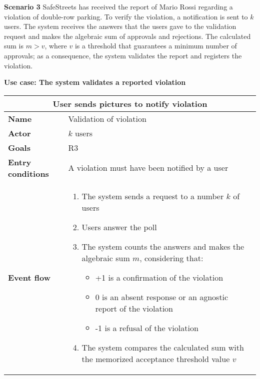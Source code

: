 \begin{description}
    \item \textbf{Scenario 3} \newline
        SafeStreets has received the report of Mario Rossi regarding a violation of double-row parking. To verify the violation, a notification is sent to $k$ users. The system receives the answers that the users gave to the validation request and makes the algebraic sum of approvals and rejections. The calculated sum is $m > v$, where $v$ is a threshold that guarantees a minimum number of approvals; as a consequence, the system validates the report and registers the violation.

    \item \textbf{Use case: The system validates a reported violation}
        \begin{center}
            \begin{tabular}{|p{3cm}|p{7cm}|}
                \multicolumn{2}{c}{\textbf{User sends pictures to notify violation}} \\
                \hline
                \textbf{Name} & Validation of violation  \\
                \hline
                \textbf{Actor} & $k$ users \\
                \hline
                \textbf{Goals} & R3 \\
                \hline
                \textbf{Entry conditions} & A violation must have been notified by a user \\
                \hline
                \textbf{Event flow} &
                \begin{enumerate}
                     \item The system sends a request to a number $k$ of users
                    \item Users answer the poll
                    \item The system counts the answers and makes the algebraic sum $m$, considering that:
                    \begin{itemize}
                        \item +1 is a confirmation of the violation
                        \item 0 is an absent response or an agnostic report of the violation
                        \item -1 is a refusal of the violation 
                    \end{itemize}
                    \item The system compares the calculated sum with the memorized acceptance threshold value $v$

\end{enumerate}
\end{tabular}
\end{center}
\end{description}
